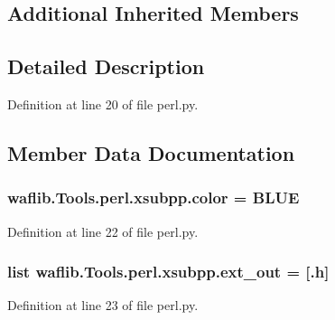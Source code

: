 \subsection*{Additional Inherited Members}


\subsection{Detailed Description}


Definition at line 20 of file perl.\+py.



\subsection{Member Data Documentation}
\subsubsection[{\texorpdfstring{color}{color}}]{ waflib.\+Tools.\+perl.\+xsubpp.\+color = \textquotesingle{}B\+L\+UE\textquotesingle{}\hspace{0.3cm}{\ttfamily [static]}}\hypertarget{classwaflib_1_1_tools_1_1perl_1_1xsubpp_a9d57fe26fc85f56d275da879dcf08933}{}\label{classwaflib_1_1_tools_1_1perl_1_1xsubpp_a9d57fe26fc85f56d275da879dcf08933}


Definition at line 22 of file perl.\+py.

\subsubsection[{\texorpdfstring{ext\+\_\+out}{ext_out}}]{\setlength{\rightskip}{0pt plus 5cm}list waflib.\+Tools.\+perl.\+xsubpp.\+ext\+\_\+out = \mbox{[}\textquotesingle{}.h\textquotesingle{}\mbox{]}\hspace{0.3cm}{\ttfamily [static]}}\hypertarget{classwaflib_1_1_tools_1_1perl_1_1xsubpp_a9ce9dd72e0deb1e8c55b3cff88a90814}{}\label{classwaflib_1_1_tools_1_1perl_1_1xsubpp_a9ce9dd72e0deb1e8c55b3cff88a90814}


Definition at line 23 of file perl.\+py.

